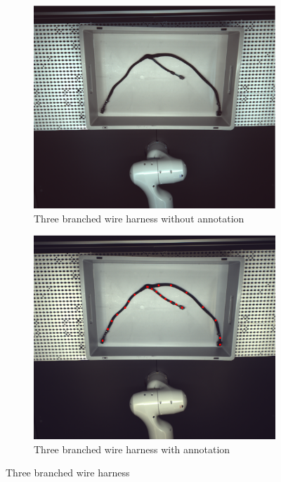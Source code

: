 	\begin{figure}[htbp]
		\centering
		\begin{subfigure}[b]{0.45\textwidth}
			\centering
			\includegraphics[width=0.9\linewidth]{example_images/img_0}
			\caption{Three branched wire harness without annotation}
			\label{fig:Three branched wire harness original}
		\end{subfigure}
		\hfill
		\begin{subfigure}[b]{0.45\textwidth}
			\centering
			\includegraphics[width=0.9\linewidth]{example_images/img_0_anno}
			\caption{Three branched wire harness with annotation}
			\label{fig:Three branched wire harness with annotation}
		\end{subfigure}
		
		\caption{Three branched wire harness}
		\label{fig:Three branched wire harness}
	\end{figure}
